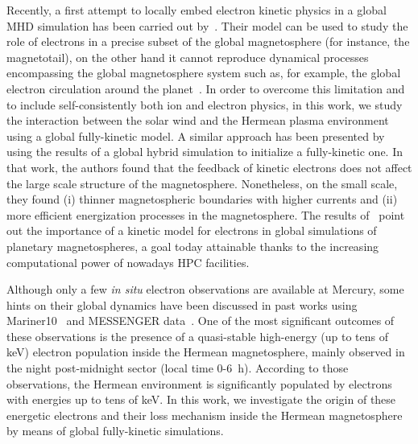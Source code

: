 \documentclass{aa}
\begin{document}
Recently, a first attempt to locally embed electron kinetic physics in a global MHD simulation has been carried out by~\citet{Chen2019}. Their model can be used to study the role of electrons in a precise subset of the global magnetosphere (for instance, the magnetotail), on the other hand it cannot reproduce dynamical processes encompassing the global magnetosphere system such as, for example, the global electron circulation around the planet~\citep{Walsh2013}. In order to overcome this limitation and to include self-consistently both ion and electron physics, in this work, we study the interaction between the solar wind and the Hermean plasma environment using a global fully-kinetic model. 
A similar approach has been presented by~\citet{Lapenta2022} using the results of a global hybrid simulation to initialize a fully-kinetic one. In that work, the authors found that the feedback of kinetic electrons does not affect the large scale structure of the magnetosphere. Nonetheless, on the small scale, they found (i) thinner magnetospheric boundaries with higher currents and (ii) more efficient energization processes in the magnetosphere. The results of~\citet{Lapenta2022} point out the importance of a kinetic model for electrons in global simulations of planetary magnetospheres, a goal today attainable thanks to the increasing computational power of nowadays HPC facilities.

Although only a few  \textit{in situ} electron observations are available at Mercury, some hints on their global dynamics have been discussed in past works using Mariner10~\citep{Christon1987} and MESSENGER  data~\citep{Ho2012,Ho2016,Baker2016,Dewey2018}. One of the most significant outcomes of these observations is the presence of a quasi-stable high-energy (up to tens of keV) electron population inside the Hermean magnetosphere, mainly observed in the night post-midnight sector (local time 0-6~h). 
According to those observations, the Hermean environment is significantly populated by electrons with energies up to tens of keV. In this work, we investigate the origin of these energetic electrons and their loss mechanism inside the Hermean magnetosphere by means of global fully-kinetic simulations.
\end{document}

